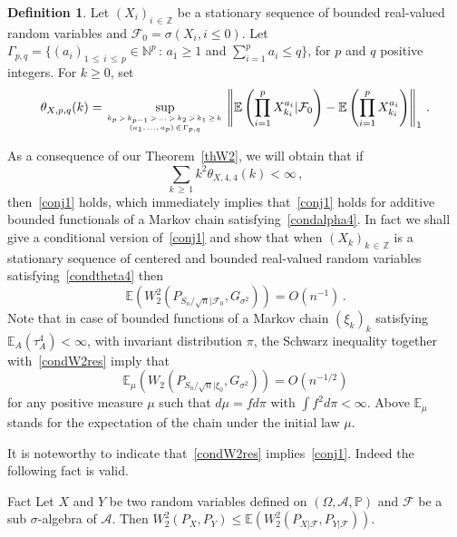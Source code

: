 \documentclass[10pt]{amsart}
\theoremstyle{definition}\newtheorem{defi}[theo]{Definition}\newtheorem{rema}[theo]{Remark}\newtheorem{exam}[theo]{Example}\newtheorem{exem}[theo]{Example}\newtheorem{nota}[theo]{Notation}
\newcommand{\bbE}{\mathbb{E}}
\newcommand{\bbZ}{\mathbb{Z}}
\newcommand{\bbN}{\mathbb{N}}
\newcommand{\clF}{\mathcal{F}}
\newcommand{\clA}{\mathcal{A}}
\newcommand{\bbP}{\mathbb{P}}
\begin{document}
\begin{defi} \label{deftheta}
Let $(X_i)_{i\,\in\,\bbZ}$ be a stationary sequence of bounded real-valued random variables and $\clF_0 = \sigma (X_i, i \leq 0)$. Let
$ \Gamma_{p,q} = \{ (a_i)_{1\,\leq\,i \,\leq\,p} \in \bbN^p \, : \, a_1 \geq 1$ and  $\sum_{i=1}^p a_i \leq q \} $, for $p$ and $q$ positive integers. For $k\geq 0$, set
\[
\theta_{X,p,q} (k) = \sup_{ k_p\,>\,k_{p-1}\,>\,\ldots\,>\,k_2\,>\,k_1\,\geq\,k\,\atop (a_1,\,\dots,\,a_p)\,\in\,\Gamma_{p,q}} \left \Vert \bbE \left(\prod_{i=1}^p X_{k_i}^{a_i} | {\clF_0 } \right) - \bbE \left (\prod_{i=1}^p X_{k_i}^{a_i} \right) \right\Vert_1 \,.
\]
\end{defi}
As a consequence of our Theorem~\ref{thW2}, we will obtain that if
\begin{equation}\label{condtheta4}
\sum_{k\,\geq\,1} k^2 \theta_{X,4,4} (k) < \infty \,,
\end{equation}
then~\eqref{conj1} holds, which immediately implies that~\eqref{conj1} holds for additive bounded functionals of a Markov chain satisfying~\eqref{condalpha4}. In fact we shall give a conditional version of~\eqref{conj1} and show that when $(X_k)_{k\,\in\,\bbZ}$ is a stationary sequence of centered and bounded real-valued random variables satisfying~\eqref{condtheta4} then
\begin{equation}\label{condW2res}
\bbE \left(W_2^2 \left(P_{S_n / {\sqrt n} |\clF_0 }, G_{\sigma^2}\right) \right) = O (n^{-1}) \,.
\end{equation}
Note that in case of bounded functions of a Markov chain $(\xi_k)_k$ satisfying $\bbE_A (\tau_A^4) < \infty$, with invariant distribution $\pi$, the Schwarz inequality together with~\eqref{condW2res} imply that
\[
\bbE_\mu \left(W_2 \left(P_{S_n / {\sqrt n} |{\xi}_0 }, G_{\sigma^2}\right) \right) = O (n^{-1/2})
\]
for any positive measure $\mu$ such that $d \mu = f d \pi $ with $\int f^2 d \pi < \infty$. Above $ \bbE_\mu$ stands for the expectation of the chain under the initial law $\mu$.


It is noteworthy to indicate that~\eqref{condW2res} implies~\eqref{conj1}. Indeed the following fact is valid.


\begin{enonce}
{Fact}\label{CompQCCondQC}
Let $X$ and $Y$ be two random variables defined on $(\Omega,\clA, \bbP)$ and $\clF$ be a sub $\sigma$-algebra of $\clA$. Then $W_2^2 (P_{X }, P_{Y }) \leq \bbE (W_2^2 (P_{X | \clF}, P_{Y | \clF}))$.
\end{enonce}
\end{document}
